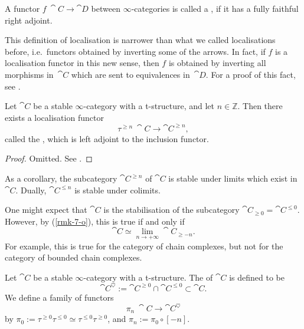 \begin{definition}
    A functor $f\:\cat{C}\to\cat{D}$ between $\infty$-categories
    is called a , if 
    it has a fully faithful right adjoint.
\end{definition}

\begin{remark}
    This definition of localisation
    is narrower than what we called localisations before,
    i.e.\ functors obtained by inverting some of the arrows.
    In fact, if $f$ is a localisation functor in this new sense,
    then $f$ is obtained by inverting all morphisms in~$\cat{C}$
    which are sent to equivalences in~$\cat{D}$.
    For a proof of this fact, see \cite[Proposition~5.2.7.12]{htt}. \varqed
\end{remark}

\begin{theorem}
    Let $\cat{C}$ be a stable $\infty$-category with a t-structure,
    and let $n\in\mathbb Z$. Then there exists a localisation functor
    \[ \tau^{\geq n}\:\cat{C}\to\cat{C}^{\geq n}, \]
    called the , which is left adjoint
    to the inclusion functor.
\end{theorem}

\begin{proof}
    Omitted. See \cite[Proposition~1.2.1.5]{ha}.
\end{proof}

As a corollary, the subcategory $\cat{C}^{\geq n}$ of $\cat{C}$
is stable under limits which exist in $\cat{C}$.
Dually, $\cat{C}^{\leq n}$ is stable under colimits.

\begin{remark}
    One might expect that $\cat{C}$ is the stabilisation of
    the subcategory $\cat{C}_{\geq0}=\cat{C}^{\leq0}$.
    However, by (\ref{rmk-7-o}), this is true if and only if 
    \[\cat{C}\simeq\lim_{n\to+\infty}\cat{C}_{\geq-n}.\]
    For example, this is true for the category of chain complexes,
    but not for the category of bounded chain complexes.
\end{remark}

\begin{definition}
    Let $\cat{C}$ be a stable $\infty$-category with a t-structure.
    The  of $\cat{C}$ is defined to be 
    \[ \cat{C}^\heartsuit:=\cat{C}^{\geq0}\cap\cat{C}^{\leq0}\subset\cat{C}. \]
    We define a family of functors
    \[ \pi_n\:\cat{C}\to\cat{C}^\heartsuit \]
    by $\pi_0:=\tau^{\geq0}\tau^{\leq0}\simeq\tau^{\leq0}\tau^{\geq0}$,
    and $\pi_n:=\pi_0\circ[-n]$.
\end{definition}

